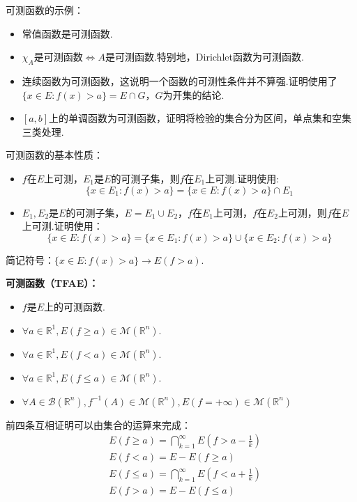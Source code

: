 \documentclass[bwprint, withoutpreface]{cumcmthesis}
\begin{document}
可测函数的示例：
\begin{itemize}[itemindent=2em]
	\item 常值函数是可测函数.
	\item $\chi_A$是可测函数$\Leftrightarrow$$A$是可测函数.特别地，Dirichlet函数为可测函数.
	\item 连续函数为可测函数，这说明一个函数的可测性条件并不算强.证明使用了$\{x \in E: f(x) > a\} = E \cap G$，$G$为开集的结论.
	\item $[a, b]$上的单调函数为可测函数，证明将检验的集合分为区间，单点集和空集三类处理.
\end{itemize}

可测函数的基本性质：
\begin{itemize}[itemindent=2em]
	\item $f$在$E$上可测，$E_1$是$E$的可测子集，则$f$在$E_1$上可测.证明使用:
	\begin{equation*}
		\{x \in E_1: f(x) > a\} = \{x \in E: f(x) > a\} \cap E_1
	\end{equation*}
	\item $E_1, E_2$是$E$的可测子集，$E = E_1 \cup E_2$，$f$在$E_1$上可测，$f$在$E_2$上可测，则$f$在$E$上可测.证明使用：
	\begin{equation*}
		\{x \in E: f(x) > a\} = \{x \in E_1: f(x) > a\} \cup \{x \in E_2: f(x) > a\}
	\end{equation*}	
\end{itemize}

简记符号：$\{x \in E: f(x) > a\} \to E(f > a)$.

\textbf{可测函数（TFAE）：}
\begin{itemize}[itemindent=2em]
	\item $f$是$E$上的可测函数.
	\item $\forall a \in \mathbb{R}^1, E(f \geqslant a) \in \mathcal{M}(\mathbb{R}^n)$.
	\item $\forall a \in \mathbb{R}^1, E(f < a) \in \mathcal{M}(\mathbb{R}^n)$.
	\item $\forall a \in \mathbb{R}^1, E(f \leqslant a) \in \mathcal{M}(\mathbb{R}^n)$.
	\item $\forall A \in \mathcal{B}(\mathbb{R}^n), f^{-1}(A) \in \mathcal{M}(\mathbb{R}^n), E(f = +\infty) \in \mathcal{M}(\mathbb{R}^n)$
\end{itemize}

前四条互相证明可以由集合的运算来完成：
\begin{align*}
	& E(f \geqslant a) = \bigcap_{k = 1}^{\infty}{E(f > a - \frac{1}{k})} \\
	& E(f < a) = E - E(f \geqslant a) \\
	& E(f \leqslant a) = \bigcap_{k = 1}^{\infty}{E(f < a + \frac{1}{k})} \\
	& E(f > a) = E - E(f \leqslant a)
\end{align*}
\end{document}
